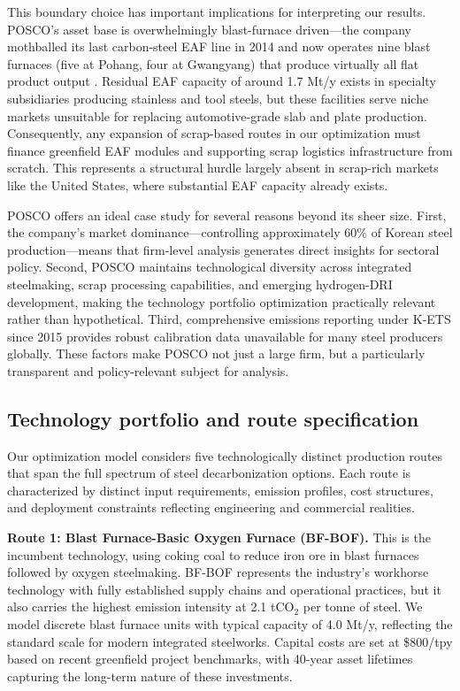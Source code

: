 \documentclass[preprint,1p,authoryear]{elsarticle}
\begin{document}
This boundary choice has important implications for interpreting our results. POSCO's asset base is overwhelmingly blast-furnace driven—the company mothballed its last carbon-steel EAF line in 2014 and now operates nine blast furnaces (five at Pohang, four at Gwangyang) that produce virtually all flat product output \citep{POSCO2023SR,KOSA2024Yearbook}. Residual EAF capacity of around 1.7 Mt/y exists in specialty subsidiaries producing stainless and tool steels, but these facilities serve niche markets unsuitable for replacing automotive-grade slab and plate production. Consequently, any expansion of scrap-based routes in our optimization must finance greenfield EAF modules and supporting scrap logistics infrastructure from scratch. This represents a structural hurdle largely absent in scrap-rich markets like the United States, where substantial EAF capacity already exists.

POSCO offers an ideal case study for several reasons beyond its sheer size. First, the company's market dominance—controlling approximately 60\% of Korean steel production—means that firm-level analysis generates direct insights for sectoral policy. Second, POSCO maintains technological diversity across integrated steelmaking, scrap processing capabilities, and emerging hydrogen-DRI development, making the technology portfolio optimization practically relevant rather than hypothetical. Third, comprehensive emissions reporting under K-ETS since 2015 provides robust calibration data unavailable for many steel producers globally. These factors make POSCO not just a large firm, but a particularly transparent and policy-relevant subject for analysis.

\subsection{Technology portfolio and route specification}

Our optimization model considers five technologically distinct production routes that span the full spectrum of steel decarbonization options. Each route is characterized by distinct input requirements, emission profiles, cost structures, and deployment constraints reflecting engineering and commercial realities.

\textbf{Route 1: Blast Furnace-Basic Oxygen Furnace (BF-BOF).} This is the incumbent technology, using coking coal to reduce iron ore in blast furnaces followed by oxygen steelmaking. BF-BOF represents the industry's workhorse technology with fully established supply chains and operational practices, but it also carries the highest emission intensity at 2.1 tCO$_2$ per tonne of steel. We model discrete blast furnace units with typical capacity of 4.0 Mt/y, reflecting the standard scale for modern integrated steelworks. Capital costs are set at \$800/tpy based on recent greenfield project benchmarks, with 40-year asset lifetimes capturing the long-term nature of these investments.
\end{document}
